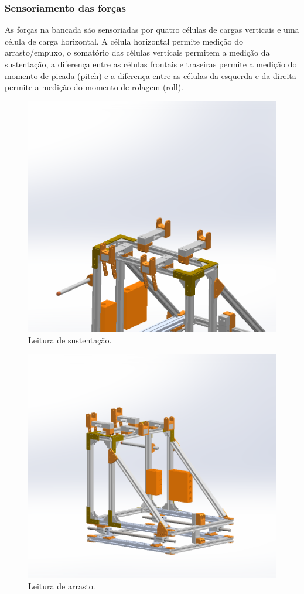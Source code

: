 \subsubsection{Sensoriamento das forças}

As forças na bancada são sensoriadas por quatro células de cargas verticais e uma célula de carga horizontal. A célula horizontal permite medição do arrasto/empuxo, o somatório das células verticais permitem a medição da sustentação, a diferença entre as células frontais e traseiras permite a medição do momento de picada (pitch) e a diferença entre as células da esquerda e da direita permite a medição do momento de rolagem (roll).

\begin{figure}[!ht]
    \centering
    \includegraphics[width=.8\linewidth]{figuras/renders/esquematico_celulas_lift.png}
    \caption{Leitura de sustentação\cite{autor}.}
    \label{fig:leitura_sustentacao}
\end{figure}

\begin{figure}[!ht]
    \centering
    \includegraphics[width=.8\linewidth]{figuras/renders/esquematico_celulas_drag_2.png}
    \caption{Leitura de arrasto\cite{autor}.}
    \label{fig:leitura_arrasto}
\end{figure}

